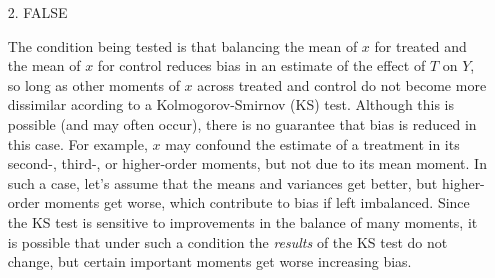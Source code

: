\documentclass{article}
\begin{document}
\begin{itemize}
    \item[2.]  FALSE 

      The condition being tested is that balancing the mean of $x$ for
      treated and the mean of $x$ for control reduces bias in an
      estimate of the effect of $T$ on $Y$, so long as other moments
      of $x$ across treated and control do not become more dissimilar
      acording to a Kolmogorov-Smirnov (KS) test.  Although this is
      possible (and may often occur), there is no guarantee that bias
      is reduced in this case.  For example, $x$ may confound the
      estimate of a treatment in its second-, third-, or higher-order
      moments, but not due to its mean moment.  In such a case, let's
      assume that the means and variances get better, but higher-order
      moments get worse, which contribute to bias if left imbalanced.
      Since the KS test is sensitive to improvements in the balance of
      many moments, it is possible that under such a condition the
      {\em results} of the KS test do not change, but certain
      important moments get worse increasing bias.  





%



\end{itemize}
\end{document}
